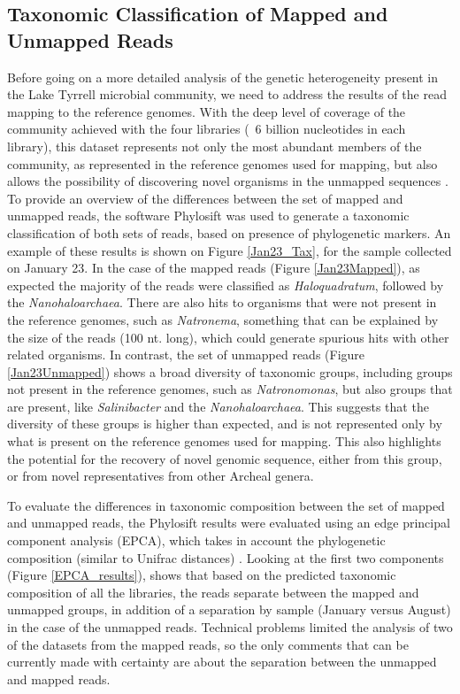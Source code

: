 \clearpage
\subsection{Taxonomic Classification of Mapped and Unmapped Reads}

Before going on a more detailed analysis of the genetic heterogeneity present in the Lake Tyrrell microbial community, we need to address the results of the read mapping to the reference genomes. With the deep level of coverage of the community achieved with the four libraries (~6 billion nucleotides in each library), this dataset represents not only the most abundant members of the community, as represented in the reference genomes used for mapping, but also allows the possibility of discovering novel organisms in the unmapped sequences \cite{Narasingarao:2012kp,Albertsen:2013gpa}. To provide an overview of the differences between the set of mapped and unmapped reads, the software Phylosift  \cite{Darling:2014ej} was used to generate a taxonomic classification of both sets of reads, based on presence of phylogenetic markers. An example of these results is shown on Figure \ref{Jan23_Tax}, for the sample collected on January 23. In the case of the mapped reads (Figure \ref{Jan23Mapped}), as expected the majority of the reads were classified as \textit{Haloquadratum}, followed by the \textit{Nanohaloarchaea}. There are also hits to organisms that were not present in the reference genomes, such as \textit{Natronema}, something that can be explained by the size of the reads (100 nt. long), which could generate spurious hits with other related organisms. In contrast, the set of unmapped reads (Figure \ref{Jan23Unmapped}) shows a broad diversity of taxonomic groups, including groups not present in the reference genomes, such as \textit{Natronomonas}, but also groups that are present, like \textit{Salinibacter} and the \textit{Nanohaloarchaea}. This suggests that the diversity of these groups is higher than expected, and is not represented only by what is present on the reference genomes used for mapping. This also highlights the potential for the recovery of novel genomic sequence, either from this group, or from novel representatives from other Archeal genera.

To evaluate the differences in taxonomic composition between the set of mapped and unmapped reads, the Phylosift results were evaluated using an edge principal component analysis (EPCA), which takes in account the phylogenetic composition (similar to Unifrac distances) \cite{Matsen:2011wn}. Looking at the first two components (Figure \ref{EPCA_results}), shows that based on the predicted taxonomic composition of all the libraries, the reads separate between the mapped and unmapped groups, in addition of a separation by sample (January versus August) in the case of the unmapped reads. Technical problems limited the analysis of two of the datasets from the mapped reads, so the only comments that can be currently made with certainty are about the separation between the unmapped and mapped reads.

